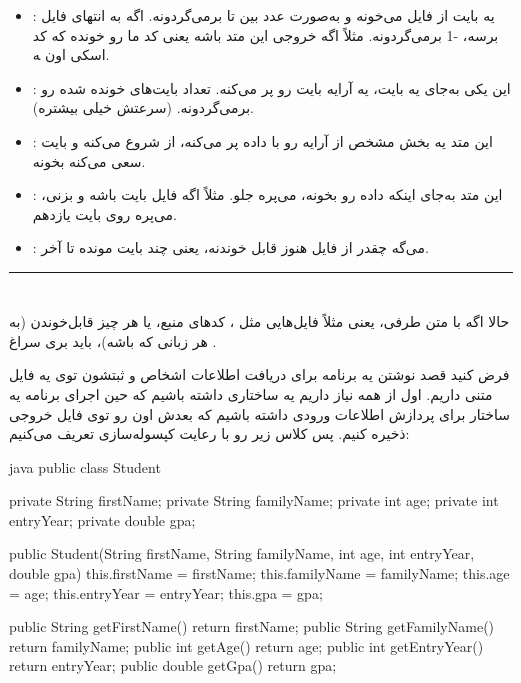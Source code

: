 \begin{itemize}
\item
   : یه بایت از فایل می‌خونه و به‌صورت عدد بین
   تا  برمی‌گردونه. اگه به انتهای فایل
  برسه، -1 برمی‌گردونه. مثلاً اگه خروجی این متد  باشه یعنی
  کد ما  رو خونده که کد اسکی اون  ‍ه.
\item
   : این یکی به‌جای یه بایت، یه آرایه
  بایت رو پر می‌کنه. تعداد بایت‌های خونده شده رو برمی‌گردونه. (سرعتش خیلی
  بیشتره).
\item
   : این متد یه بخش
  مشخص از آرایه رو با داده پر می‌کنه، از  شروع می‌کنه و
   بایت سعی می‌کنه بخونه.
\item
   : این متد به‌جای اینکه داده رو بخونه،
  می‌پره جلو. مثلاً اگه فایل  بایت باشه و
   بزنی، می‌پره روی بایت یازدهم.
\item
   : می‌گه چقدر از فایل هنوز قابل خوندنه،
  یعنی چند بایت مونده تا آخر.
\end{itemize}

\begin{center}\rule{0.5\linewidth}{0.5pt}\end{center}

\section{}

حالا اگه با متن طرفی، یعنی مثلاً فایل‌هایی مثل ، کدهای
منبع، یا هر چیز قابل‌خوندن (به هر زبانی که باشه)، باید بری سراغ
 .

فرض کنید قصد نوشتن یه برنامه برای دریافت اطلاعات اشخاص و ثبتشون توی یه
فایل متنی داریم. اول از همه نیاز داریم یه ساختاری داشته باشیم که حین
اجرای برنامه یه ساختار برای پردازش اطلاعات ورودی داشته باشیم که بعدش اون
رو توی فایل خروجی ذخیره کنیم. پس کلاس زیر رو با رعایت کپسوله‌سازی تعریف
می‌کنیم:

\begin{codebox}{java}
public class Student {
    private String firstName;
    private String familyName;
    private int age;
    private int entryYear;
    private double gpa;    
    
    public Student(String firstName, String familyName, int age, int entryYear, double gpa) {
        this.firstName = firstName;
        this.familyName = familyName;
        this.age = age;
        this.entryYear = entryYear;
        this.gpa = gpa;
    }

    public String getFirstName() { return firstName; }
    public String getFamilyName() { return familyName; }
    public int getAge() { return age; }
    public int getEntryYear() { return entryYear; }
    public double getGpa() { return gpa; }
}
\end{codebox}


